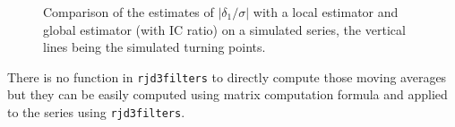 \documentclass[
]{article}
\newcommand\1{\mathds{1}}
\begin{document}
\begin{figure}[H]

\caption{\label{fig-mmpenteconcac-ex}Comparison of the estimates of
\(|\delta_1/\sigma|\) with a local estimator and global estimator (with
IC ratio) on a simulated series, the vertical lines being the simulated
turning points.}

\begin{minipage}{\linewidth}



\end{minipage}%
\newline
\begin{minipage}{\linewidth}



\end{minipage}%

\end{figure}%

There is no function in \texttt{rjd3filters} to directly compute those
moving averages but they can be easily computed using matrix computation
formula and applied to the series using \texttt{rjd3filters}.
\end{document}
